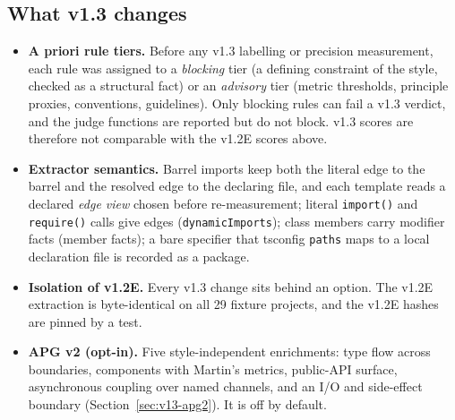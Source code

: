 \documentclass[10pt,a4paper]{article}
\begin{document}
\subsection{What v1.3 changes}\label{sec:v13-changes}

\begin{itemize}
  \item \textbf{A priori rule tiers.} Before any v1.3 labelling or precision measurement, each rule was assigned to a
        \emph{blocking} tier (a defining constraint of the style, checked as a structural fact) or an
        \emph{advisory} tier (metric thresholds, principle proxies, conventions, guidelines). Only blocking rules can
        fail a v1.3 verdict, and the judge functions are reported but do not block. v1.3 scores are therefore not
        comparable with the v1.2E scores above. %
  \item \textbf{Extractor semantics.} Barrel imports keep both the literal edge to the barrel and the resolved edge
        to the declaring file, and each template reads a declared \emph{edge view} chosen before re-measurement;
        literal \texttt{import()} and \texttt{require()} calls give edges (\texttt{dynamicImports}); class members
        carry modifier facts (member facts); a bare specifier that tsconfig \texttt{paths} maps to a local
        declaration file is recorded as a package. %
  \item \textbf{Isolation of v1.2E.} Every v1.3 change sits behind an option. The v1.2E extraction is byte-identical
        on all 29 fixture projects, and the v1.2E hashes are pinned by a test. %
  \item \textbf{APG v2 (opt-in).} Five style-independent enrichments: type flow across boundaries, components with
        Martin's metrics, public-API surface, asynchronous coupling over named channels, and an I/O and side-effect
        boundary (Section~\ref{sec:v13-apg2}). It is off by default. %
\end{itemize}
\end{document}
